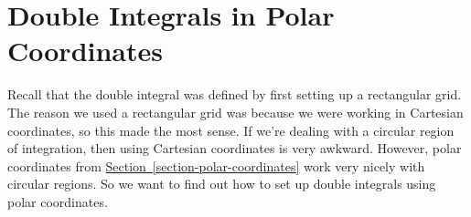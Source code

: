 \documentclass[10pt,]{book}
\theoremstyle{ptxplainnotitle}
\theoremstyle{ptxplaintitle}
\theoremstyle{ptxplainnotitle}
\theoremstyle{ptxplaintitle}
\theoremstyle{ptxplainnotitle}
\theoremstyle{ptxplaintitle}
\theoremstyle{ptxdefinitionnotitle}
\theoremstyle{ptxdefinitiontitle}
\theoremstyle{ptxdefinitionnotitle}
\theoremstyle{ptxdefinitiontitle}
\theoremstyle{ptxdefinitionnotitle}
\theoremstyle{ptxdefinitiontitle}
\theoremstyle{ptxdefinitionnotitle}
\theoremstyle{ptxdefinitiontitle}
\theoremstyle{ptxdefinitionnotitle}
\theoremstyle{ptxdefinitiontitle}
\numberwithin{equation}{section}
\begin{document}
\section[{Double Integrals in Polar Coordinates}]{Double Integrals in Polar Coordinates}\label{section-double-integrals-in-polar-coordinates}
\hypertarget{p-1141}{}%
Recall that the double integral was defined by first setting up a rectangular grid. The reason we used a rectangular grid was because we were working in Cartesian coordinates, so this made the most sense. If we're dealing with a circular region of integration, then using Cartesian coordinates is very awkward. However, polar coordinates from \hyperref[section-polar-coordinates]{Section~\ref{section-polar-coordinates}} work very nicely with circular regions. So we want to find out how to set up double integrals using polar coordinates.%
\par
\hypertarget{p-1142}{}%
\end{document}
